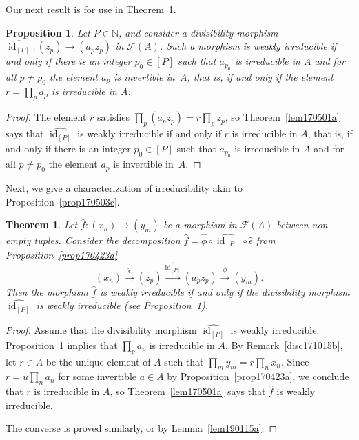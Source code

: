 \documentclass[reqno]{amsart}
\theoremstyle{plain}
\newtheorem{prop}[lem]{Proposition}
\newtheorem{thm}[lem]{Theorem}
\theoremstyle{definition}
\newcommand{\cat}[1]{\mathcal{#1}}
\newcommand{\catf}{\cat{F}}
\newcommand{\id}{\operatorname{id}}
\newcommand{\bbn}{\mathbb{N}}
\newcommand{\xra}{\xrightarrow}
\numberwithin{equation}{lem}
\begin{document}
Our next result is for use in Theorem~\ref{prop170501a}.

\begin{prop}\label{prop170501b}
Let $P\in\bbn$, and
consider a divisibility morphism
$\widehat{\id_{[P]}}\colon(z_p)\to(a_pz_p)$ in $\catf(A)$. 
Such a morphism is 
weakly
irreducible if and only if there is an integer $p_0\in[P]$ such that
$a_{p_0}$ is irreducible in $A$ and for all $p\neq p_0$ the element $a_p$ is invertible in~$A$,
that is, if and only if the element $r=\prod_pa_p$ is irreducible in $A$.
\end{prop}

\begin{proof}
The element $r$ satisfies $\prod_p(a_pz_p)=r\prod_pz_p$, so Theorem~\ref{lem170501a} says that
$\widehat{\id_{[P]}}$ is weakly irreducible if and only if $r$ is irreducible in $A$, that is, if and only if 
there is an integer $p_0\in[P]$ such that
$a_{p_0}$ is irreducible in $A$ and for all $p\neq p_0$ the element $a_p$ is invertible in~$A$.
\end{proof}

Next, we give a characterization of irreducibility akin to Proposition~\ref{prop170503c}.

\begin{thm}\label{prop170501a}
Let $\hat f\colon(x_n)\to (y_m)$ be a morphism in $\catf(A)$ between non-empty tuples.
Consider the decomposition $\hat f=\hat\phi\circ\widehat{\id_{[P]}}\circ\hat\epsilon$ from Proposition~\ref{prop170423a}
$$(x_n)\xra{\hat\epsilon}(z_p)\xra{\widehat{\id_{[P]}}}(a_pz_p)
\xra{\hat\phi}(y_m).$$
Then 
the morphism $\hat f$ is 
weakly
irreducible
if and only if the divisibility morphism
$\widehat{\id_{[P]}}$ is 
weakly
irreducible (see Proposition~\ref{prop170501b}).
\end{thm}

\begin{proof}
Assume that the divisibility morphism
$\widehat{\id_{[P]}}$ is 
weakly
irreducible. Proposition~\ref{prop170501b} implies that $\prod_pa_p$ is irreducible in $A$.
By Remark~\ref{disc171015b}, let $r\in A$ be the unique element of $A$ such that $\prod_my_m=r\prod_nx_n$.
Since $r=u\prod_na_n$ for some invertible $a\in A$ by Proposition~\ref{prop170423a}, we conclude that $r$ is irreducible in $A$, so
Theorem~\ref{lem170501a} says that $\hat f$ is weakly
irreducible.

The converse is proved similarly, or by Lemma~\ref{lem190115a}.
\end{proof}
\end{document}
